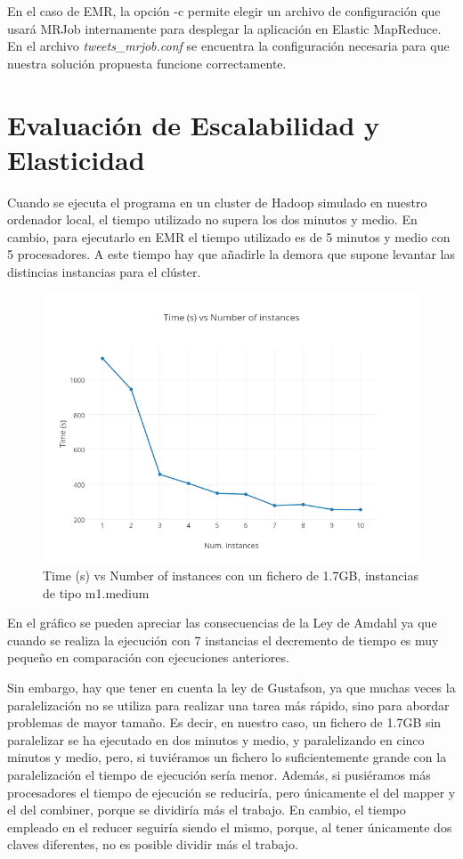 \documentclass[12pt,a4paper]{article}
\begin{document}
En el caso de EMR, la opción -c permite elegir un archivo de configuración que usará MRJob internamente para desplegar la aplicación en Elastic MapReduce. En el archivo \textit{tweets\_mrjob.conf} se encuentra la configuración necesaria para que nuestra solución propuesta funcione correctamente.

\section{Evaluación de Escalabilidad y Elasticidad}

Cuando se ejecuta el programa en un cluster de Hadoop simulado en nuestro ordenador local, el tiempo  utilizado no supera los dos minutos y medio. En cambio, para ejecutarlo en EMR el tiempo utilizado es de 5 minutos y medio con 5 procesadores. A este tiempo hay que añadirle la demora que supone levantar las distincias instancias para el clúster. 

\begin{figure}[h]
\centering
\includegraphics[scale=0.5]{plot.png}
\caption{Time (s) vs Number of instances con un fichero de 1.7GB, instancias de tipo m1.medium}
\end{figure}

En el gráfico se pueden apreciar las consecuencias de la Ley de Amdahl ya que cuando se realiza la ejecución con 7 instancias el decremento de tiempo es muy pequeño en comparación con ejecuciones anteriores. 

Sin embargo, hay que tener en cuenta la ley de Gustafson, ya que muchas veces la paralelización no se utiliza para realizar una tarea más rápido, sino para abordar problemas de mayor tamaño. Es decir, en nuestro caso, un fichero de 1.7GB sin paralelizar se ha ejecutado en dos minutos y medio, y paralelizando en cinco minutos y medio, pero, si tuviéramos un fichero lo suficientemente grande con la paralelización el tiempo de ejecución sería menor. Además, si pusiéramos más procesadores el tiempo de ejecución se reduciría, pero únicamente el del mapper y el del combiner, porque se dividiría más el trabajo. En cambio, el tiempo empleado en el reducer seguiría siendo el mismo, porque, al tener únicamente dos claves diferentes, no es posible dividir más el trabajo.
\end{document}
